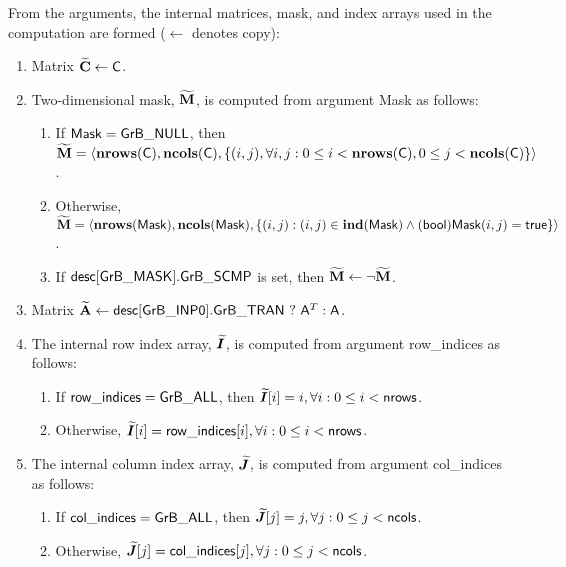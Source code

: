 From the arguments, the internal matrices, mask, and index arrays used in 
the computation are formed ($\leftarrow$ denotes copy):
\begin{enumerate}
	\item Matrix ${\bf \widetilde{C}} \leftarrow {\sf C}$.

	\item Two-dimensional mask, ${\bf \widetilde{M}}$, is computed from 
    argument {\sf Mask} as follows:
	\begin{enumerate}

		\item	If ${\sf Mask} = {\sf GrB\_NULL}$, then ${\bf \widetilde{M}} = 
        \langle \bold{nrows}({\sf C}), \bold{ncols}({\sf C}), \{(i,j), 
        \forall i,j : 0 \leq i <  \bold{nrows}({\sf C}), 0 \leq j < 
        \bold{ncols}({\sf C}) \} \rangle$.

		\item	Otherwise, ${\bf \widetilde{M}} = \langle \bold{nrows}({\sf Mask}), 
        \bold{ncols}({\sf Mask}), \{(i,j) : (i,j) \in \bold{ind}({\sf Mask}) \wedge 
        ({\sf bool}){\sf Mask}(i,j) = {\sf true}\} \rangle$.

		\item	If ${\sf desc[GrB\_MASK].GrB\_SCMP}$ is set, then 
        ${\bf \widetilde{M}} \leftarrow \neg {\bf \widetilde{M}}$.

	\end{enumerate}

	\item Matrix ${\bf \widetilde{A}} \leftarrow 
    {\sf desc[GrB\_INP0].GrB\_TRAN} \ ? \ {\sf A}^T : {\sf A}$.
    
    \item The internal row index array, $\bm{\widetilde{I}}$, is computed from 
    argument {\sf row\_indices} as follows:
	\begin{enumerate}
		\item	If ${\sf row\_indices} = {\sf GrB\_ALL}$, then 
        $\bm{\widetilde{I}}[i] = i, \forall i : 0 \leq i < {\sf nrows} $.

		\item	Otherwise, $\bm{\widetilde{I}}[i] = {\sf row\_indices}[i], 
        \forall i : 0 \leq i < {\sf nrows}$.
    \end{enumerate}
    
    \item The internal column index array, $\bm{\widetilde{J}}$, is computed from 
    argument {\sf col\_indices} as follows:
	\begin{enumerate}
		\item	If ${\sf col\_indices} = {\sf GrB\_ALL}$, then 
        $\bm{\widetilde{J}}[j] = j, \forall j : 0 \leq j < {\sf ncols}$.

		\item	Otherwise, $\bm{\widetilde{J}}[j] = {\sf col\_indices}[j], 
        \forall j : 0 \leq j < {\sf ncols}$.
    \end{enumerate}
\end{enumerate}

